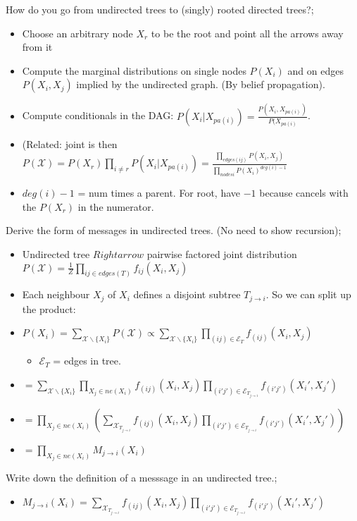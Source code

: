 \documentclass{article}
\begin{document}
How do you go from undirected trees to (singly) rooted directed trees?; \begin{itemize} \item Choose an arbitrary node $X_r$ to be the root and point all the arrows away from it \item Compute the marginal distributions on single nodes $P(X_i)$ and on edges $P(X_i, X_j)$ implied by the undirected graph. (By belief propagation).  \item Compute conditionals in the DAG: $P(X_i|X_{pa(i)}) = \frac{P(X_i, X_{pa(i)})}{P(X_{pa(i)}}$.  \item (Related: joint is then $P(\mathcal{X})=P(X_r)\prod_{i\ne r}P(X_i|X_{pa(i)})=\frac{\prod_{edges(ij)}P(X_i, X_j)}{\prod_{nodes i}P(X_i)^{deg(i)-1}}$ \item $deg(i) - 1$ = num times a parent. For root, have $-1$ because cancels with the $P(X_r)$ in the numerator.  \end{itemize}

Derive the form of messages in undirected trees. (No need to show recursion); \begin{itemize} \item Undirected tree $Rightarrow$ pairwise factored joint distribution $P(\mathcal{X})= \frac{1}{Z}\prod_{ij \in edges(T)}f_{ij}(X_i, X_j)$ \item Each neighbour $X_j$ of $X_i$ defines a disjoint subtree $T_{j\rightarrow i}$. So we can split up the product: \item $P(X_i) = \sum_{\mathcal{X}\backslash\{X_i\}} P(\mathcal{X}) \propto \sum_{\mathcal{X}\backslash\{X_i\}}\prod_{(ij)\in \mathcal{E}_T} f_{(ij)}(X_i, X_j)$ \begin{itemize} \item $\mathcal{E}_T$ = edges in tree.  \end{itemize} \item $= \sum_{\mathcal{X}\backslash\{X_i\}}\prod_{X_j\in ne(X_i)}f_{(ij)}(X_i, X_j)\prod_{(i'j')\in \mathcal{E}_{T_{j\rightarrow i}}} f_{(i'j')}(X_i', X_j')$ \item $= \prod_{X_j\in ne(X_i)}(\sum_{\mathcal{X}_{T_{j\rightarrow i}}}f_{(ij)}(X_i, X_j)\prod_{(i'j')\in \mathcal{E}_{T_{j\rightarrow i}}} f_{(i'j')}(X_i', X_j'))$ \item $= \prod_{X_j\in ne(X_i)}M_{j\rightarrow i}(X_i)$ \end{itemize}

Write down the definition of a messsage in an undirected tree.; \begin{itemize} \item  $M_{j\rightarrow i}(X_i) =\sum_{\mathcal{X}_{T_{j\rightarrow i}}}f_{(ij)}(X_i, X_j)\prod_{(i'j')\in \mathcal{E}_{T_{j\rightarrow i}}} f_{(i'j')}(X_i', X_j')$ \end{itemize} 
\end{document}
